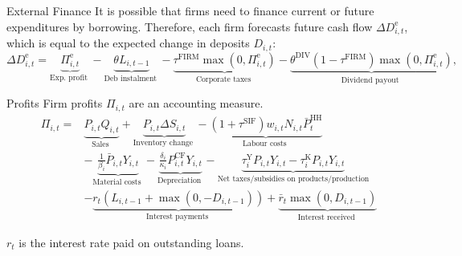 \documentclass[9pt]{beamer}
\begin{document}
\begin{frame}{External Finance}
    It is possible that firms need to finance current or future expenditures by borrowing.  Therefore, each firm forecasts future cash flow $\Delta D_{i,t}^{\mathrm{e}}$, which is equal to the expected change in deposits $D_{i,t}$:
\begin{equation}
    \scriptstyle \Delta D_{i,t}^{\mathrm{e}} =\underbrace{\Pi_{i,t}^{\mathrm{e}} }_{\text {Exp. profit }}-\underbrace{\theta L_{i,t-1} }_{\text {Deb instalment }}-\underbrace{\tau^{\mathrm{FIRM}} \max \left(0, \Pi_{i,t}^{\mathrm{e}} \right)}_{\text {Corporate taxes }}-\underbrace{\theta^{\mathrm{DIV}}\left(1-\tau^{\mathrm{FIRM}}\right) \max \left(0, \Pi_{i,t}^{\mathrm{e}} \right)}_{\text {Dividend payout }},
\end{equation}
    \hyperlink{ReturnOverview}{}

\end{frame}
\begin{frame}{Profits}
    Firm profits $\Pi_{i,t}$ are an accounting measure.
\begin{equation}
\begin{aligned}
\Pi_{i,t}= & \underbrace{P_{i,t} Q_{i,t}}_{\text {Sales }}+\underbrace{P_{i,t} \Delta S_{i,t}}_{\text {Inventory change }}-\underbrace{\left(1+\tau^{\mathrm{SIF}}\right) w_{i,t} N_{i,t} \bar{P}_t^{\mathrm{HH}} }_{\text {Labour costs }} \\
& -\underbrace{\frac{1}{\beta_i} \bar{P}_{i,t} Y_{i,t}}_{\text {Material costs }}-\underbrace{\frac{\delta_i}{\kappa_i} P_{i,t}^{\mathrm{CF}}  Y_{i,t}}_{\text {Depreciation }}-\underbrace{\tau_i^{\mathrm{Y}} P_{i,t} Y_{i,t}-\tau_i^{\mathrm{K}} P_{i,t} Y_{i,t}}_{\text {Net taxes/subsidies on products/production}} \\
& -\underbrace{r_t \left(L_{i,t-1}+\max \left(0,-D_{i,t-1}\right)\right)}_{\text {Interest payments }}+\underbrace{\bar{r}_t  \max \left(0, D_{i,t-1}\right)}_{\text {Interest received }}
\end{aligned}
\end{equation}

 $r_t$ is the interest rate paid on outstanding loans.
     \hyperlink{ReturnOverview}{}

\end{frame}
\end{document}
